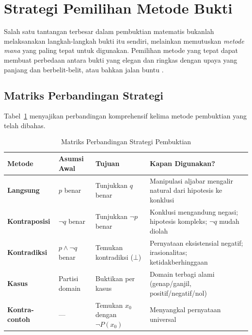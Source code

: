 \section{Strategi Pemilihan Metode Bukti}

Salah satu tantangan terbesar dalam pembuktian matematis bukanlah melaksanakan langkah-langkah bukti itu sendiri, melainkan memutuskan \emph{metode mana} yang paling tepat untuk digunakan. Pemilihan metode yang tepat dapat membuat perbedaan antara bukti yang elegan dan ringkas dengan upaya yang panjang dan berbelit-belit, atau bahkan jalan buntu \cite{velleman2019}.

\subsection{Matriks Perbandingan Strategi}

Tabel~\ref{tab:perbandingan-strategi-bukti} menyajikan perbandingan komprehensif kelima metode pembuktian yang telah dibahas.

\begin{table}[htbp]
\centering
\footnotesize
\renewcommand{\arraystretch}{1.4}
\begin{tabular}{|>{\raggedright\arraybackslash}p{2.25cm}|>{\raggedright\arraybackslash}p{1.9cm}|>{\raggedright\arraybackslash}p{1.7cm}|>{\raggedright\arraybackslash}p{5.1cm}|}
\hline
\textbf{Metode} & \textbf{Asumsi Awal} & \textbf{Tujuan} & \textbf{Kapan Digunakan?} \\ \hline
\textbf{Langsung} & $p$ benar & Tunjukkan $q$ benar & Manipulasi aljabar mengalir natural dari hipotesis ke konklusi \\ \hline
\textbf{Kontraposisi} & $\neg q$ benar & Tunjukkan $\neg p$ benar & Konklusi mengandung negasi; hipotesis kompleks; $\neg q$ mudah diolah \\ \hline
\textbf{Kontradiksi} & $p \wedge \neg q$ benar & Temukan kontradiksi ($\bot$) & Pernyataan eksistensial negatif; irasionalitas; ketidakberhinggaan \\ \hline
\textbf{Kasus} & Partisi domain & Buktikan per kasus & Domain terbagi alami (genap/ganjil, positif/negatif/nol) \\ \hline
\textbf{Kontra-contoh} & --- & Temukan $x_0$ dengan $\neg P(x_0)$ & Menyangkal pernyataan universal \\ \hline
\end{tabular}
\caption{Matriks Perbandingan Strategi Pembuktian}
\label{tab:perbandingan-strategi-bukti}
\end{table}

